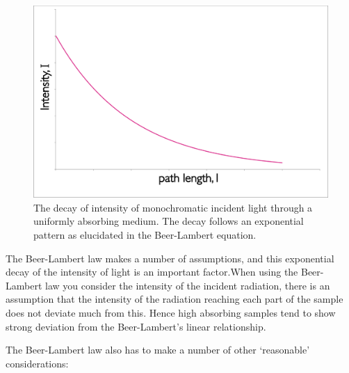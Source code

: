 \documentclass[
]{book}
\begin{document}
\begin{figure}

{\centering \includegraphics[width=0.5\linewidth]{images/BeerLambert} 

}

\caption{The decay of intensity of monochromatic incident light through a uniformly absorbing medium. The decay follows an exponential pattern as elucidated in the Beer-Lambert equation.}\label{fig:BeerLambert}
\end{figure}

The Beer-Lambert law makes a number of assumptions, and this exponential decay of the intensity of light is an important factor.When using the Beer-Lambert law you consider the intensity of the incident radiation, there is an assumption that the intensity of the radiation reaching each part of the sample does not deviate much from this. Hence high absorbing samples tend to show strong deviation from the Beer-Lambert's linear relationship.

The Beer-Lambert law also has to make a number of other `reasonable' considerations:
\end{document}
